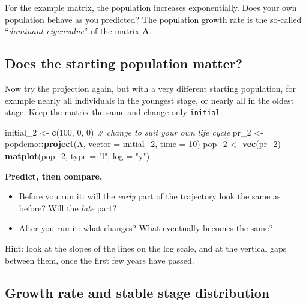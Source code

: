 \documentclass[
  a4paper]{book}
\newenvironment{Shaded}{\begin{snugshade}}{\end{snugshade}}
\newcommand{\AttributeTok}[1]{\textcolor[rgb]{0.13,0.29,0.53}{#1}}
\newcommand{\CommentTok}[1]{\textcolor[rgb]{0.56,0.35,0.01}{\textit{#1}}}
\newcommand{\DecValTok}[1]{\textcolor[rgb]{0.00,0.00,0.81}{#1}}
\newcommand{\FunctionTok}[1]{\textcolor[rgb]{0.13,0.29,0.53}{\textbf{#1}}}
\newcommand{\NormalTok}[1]{#1}
\newcommand{\OtherTok}[1]{\textcolor[rgb]{0.56,0.35,0.01}{#1}}
\newcommand{\SpecialCharTok}[1]{\textcolor[rgb]{0.81,0.36,0.00}{\textbf{#1}}}
\newcommand{\StringTok}[1]{\textcolor[rgb]{0.31,0.60,0.02}{#1}}
\providecommand{\tightlist}{%
  \setlength{\itemsep}{0pt}\setlength{\parskip}{0pt}}
\begin{document}
For the example matrix, the population increases exponentially. Does your own population behave as you predicted? The population growth rate is the so-called ``\emph{dominant eigenvalue}'' of the matrix \textbf{A}.

\subsection{Does the starting population matter?}\label{does-the-starting-population-matter}

Now try the projection again, but with a very different starting population, for example nearly all individuals in the youngest stage, or nearly all in the oldest stage. Keep the matrix the same and change only \texttt{initial}:

\begin{Shaded}
\begin{Highlighting}[]
\NormalTok{initial\_2 }\OtherTok{\textless{}{-}} \FunctionTok{c}\NormalTok{(}\DecValTok{100}\NormalTok{, }\DecValTok{0}\NormalTok{, }\DecValTok{0}\NormalTok{) }\CommentTok{\# change to suit your own life cycle}
\NormalTok{pr\_2 }\OtherTok{\textless{}{-}}\NormalTok{ popdemo}\SpecialCharTok{::}\FunctionTok{project}\NormalTok{(A, }\AttributeTok{vector =}\NormalTok{ initial\_2, }\AttributeTok{time =} \DecValTok{10}\NormalTok{)}
\NormalTok{pop\_2 }\OtherTok{\textless{}{-}} \FunctionTok{vec}\NormalTok{(pr\_2)}
\FunctionTok{matplot}\NormalTok{(pop\_2, }\AttributeTok{type =} \StringTok{"l"}\NormalTok{, }\AttributeTok{log =} \StringTok{"y"}\NormalTok{)}
\end{Highlighting}
\end{Shaded}

\textbf{Predict, then compare.}

\begin{itemize}
\tightlist
\item
  Before you run it: will the \emph{early} part of the trajectory look the same as before? Will the \emph{late} part?
\item
  After you run it: what changes? What eventually becomes the same?
\end{itemize}

Hint: look at the slopes of the lines on the log scale, and at the vertical gaps between them, once the first few years have passed.

\subsection{Growth rate and stable stage distribution}\label{growth-rate-and-stable-stage-distribution}
\end{document}
